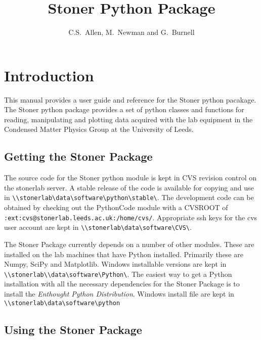 \documentclass[a4paper,11pt]{scrartcl}
\author{C.S.~Allen, M.~Newman and G.~Burnell}
\title{Stoner Python Package}
\begin{document}
\maketitle

\tableofcontents
\newpage
\pagestyle{scrheadings}  \ifoot[\today]{\today}



  \section{Introduction}

This manual provides a user guide and reference for the Stoner python pacakage. The Stoner python package provides a set of python classes and functions for reading, manipulating and plotting data acquired with the lab equipment in the Condensed Matter Physics Group at the University of Leeds.

\subsection{Getting the Stoner Package}

The source code for the Stoner python module is kept in CVS revision control on the stonerlab server. A stable release of the code is available for copying and use in \verb#\\stonerlab\data\software\python\stable\#. The development code can be obtained by checking out the PythonCode module with a CVSROOT of \\ \verb#:ext:cvs@stonerlab.leeds.ac.uk:/home/cvs/#. Appropriate ssh keys for the cvs user account are kept in \verb#\\stonerlab\data\software\CVS\#.

The Stoner Package currently depends on a number of other modules. These are installed on the lab machines that have Python installed. Primarily these are Numpy, SciPy and Matplotlib. Windows installable versions are kept in \\ \verb#\\stonerlab\\data\software\Python\#.  The easiest way to get a Python installation with all the necessary dependencies for the Stoner Package is to install the \textit{Enthought Python Distribution}. Windows install file are kept in \verb#\\stonerlab\data\software\python#


\subsection{Using the Stoner Package}
\end{document}

